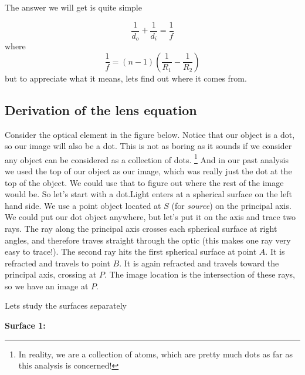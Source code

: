 \documentclass{article}
\begin{document}
The answer we will get is quite simple

\begin{equation}
\frac{1}{d_{o}}+\frac{1}{d_{i}}=\frac{1}{f}  \label{Thin_lens}
\end{equation}%
where%
\begin{equation}
\frac{1}{f}=\left( n-1\right) \left( \frac{1}{R_{1}}-\frac{1}{R_{2}}\right)
\label{Lens_maker}
\end{equation}%
but to appreciate what it means, lets find out where it comes from.

\subsection{Derivation of the lens equation}

Consider the optical element in the figure below. Notice that our object is
a dot, so our image will also be a dot. This is not as boring as it sounds
if we consider any object can be considered as a collection of dots.%
\footnote{%
In reality, we are a collection of atoms, which are pretty much dots as far
as this analysis is concerned!} And in our past analysis we used the top of
our object as our image, which was really just the dot at the top of the
object. We could use that to figure out where the rest of the image would
be. So let's start with a dot.Light enters at a spherical
surface on the left hand side. We use a point object located at $S$ (for 
\emph{source}) on the principal axis. We could put our dot object anywhere,
but let's put it on the axis and trace two rays. The ray along the principal
axis crosses each spherical surface at right angles, and therefore traves
straight through the optic (this makes one ray very easy to trace!). The
second ray hits the first spherical surface at point $A.$ It is refracted
and travels to point $B$. It is again refracted and travels toward the
principal axis, crossing at $P.$ The image location is the intersection of
these rays, so we have an image at $P.$

Lets study the surfaces separately

\textbf{Surface 1:}

\end{document}
